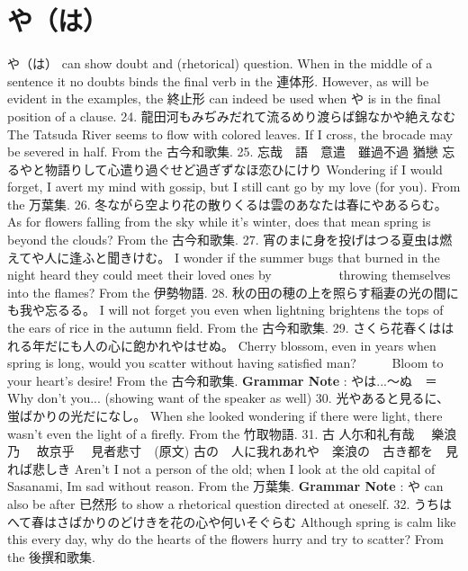 \section{や（は）}
 \hfill\break
 や（は） can show doubt and (rhetorical) question. When in the middle of a sentence it no doubts binds the final verb in the 連体形. However, as will be evident in the examples, the 終止形 can indeed be used when や is in the final position of a clause.  24. 龍田河もみぢみだれて流るめり渡らば錦なかや絶えなむ The Tatsuda River seems to flow with colored leaves. If I cross, the brocade may be severed in half. \hfill\break
From the 古今和歌集.  25. 忘哉　語　意遣　雖過不過 猶戀 \hfill\break
忘るやと物語りして心遣り過ぐせど過ぎずなほ恋ひにけり \hfill\break
Wondering if I would forget, I avert my mind with gossip, but I still can\textquotesingle t go by my love (for you). \hfill\break
From the 万葉集.  26. 冬ながら空より花の散りくるは雲のあなたは春にやあるらむ。 \hfill\break
As for flowers falling from the sky while it's winter, does that mean spring is beyond the clouds? \hfill\break
From the 古今和歌集.  27. 宵のまに身を投げはつる夏虫は燃えてや人に逢ふと聞きけむ。 \hfill\break
I wonder if the summer bugs that burned in the night heard they could meet their loved ones by             throwing themselves into the flames? \hfill\break
From the 伊勢物語.  28. 秋の田の穂の上を照らす稲妻の光の間にも我や忘るる。 \hfill\break
I will not forget you even when lightning brightens the tops of the ears of rice in the autumn field. \hfill\break
From the 古今和歌集.  29. さくら花春くははれる年だにも人の心に飽かれやはせぬ。 \hfill\break
Cherry blossom, even in years when spring is long, would you scatter without having satisfied man?       Bloom to your heart's desire! \hfill\break
From the 古今和歌集.  \textbf{Grammar Note }: やは\dothyp{}\dothyp{}\dothyp{}～ぬ　＝ Why don't you\dothyp{}\dothyp{}\dothyp{} (showing want of the speaker as well)  30. 光やあると見るに、蛍ばかりの光だになし。 \hfill\break
When she looked wondering if there were light, there wasn't even the light of a firefly. \hfill\break
From the 竹取物語.  31. 古 人尓和礼有哉　 樂浪乃 　故京乎　 見者悲寸　(原文) \hfill\break
古の　人に我れあれや　楽浪の　古き都を　見れば悲しき \hfill\break
Aren't I not a person of the old; when I look at the old capital of Sasanami, I\textquotesingle m sad without reason. \hfill\break
From the 万葉集.  \textbf{Grammar Note }: や can also be after 已然形 to show a rhetorical question directed at oneself.  32. うちはへて春はさばかりのどけきを花の心や何いそぐらむ \hfill\break
Although spring is calm like this every day, why do the hearts of the flowers hurry and try to scatter? From the 後撰和歌集.  
